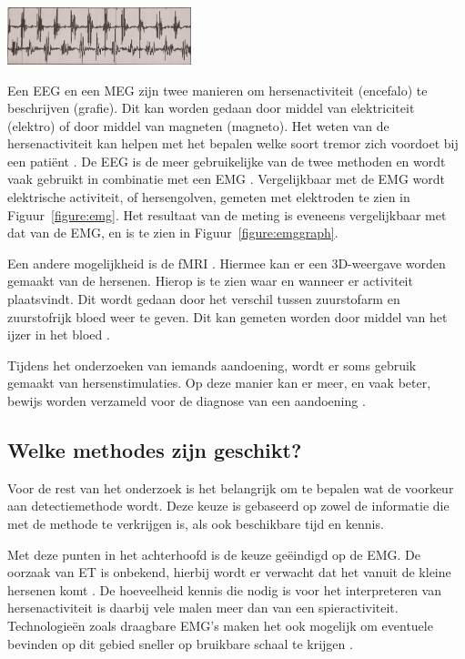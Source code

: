 \begin{center}
    \includegraphics[width=0.4\textwidth]{./graphics/graph-emg.png}
    \label{figure:emggraph}
\end{center}

Een EEG en een MEG zijn twee manieren om hersenactiviteit (encefalo) te beschrijven (grafie).
Dit kan worden gedaan door middel van elektriciteit (elektro) of door middel van magneten (magneto).
Het weten van de hersenactiviteit kan helpen met het bepalen welke soort tremor zich voordoet bij een patiënt \cite{elsevier2022,knf2022}.
De EEG is de meer gebruikelijke van de twee methoden en wordt vaak gebruikt in combinatie met een EMG \cite{knf2022}.
Vergelijkbaar met de EMG wordt elektrische activiteit, of hersengolven, gemeten met elektroden te zien in Figuur~\ref{figure:emg}.
Het resultaat van de meting is eveneens vergelijkbaar met dat van de EMG, en is te zien in Figuur~\ref{figure:emggraph}.

Een andere mogelijkheid is de fMRI \cite{elsevier2022}.
Hiermee kan er een 3D-weergave worden gemaakt van de hersenen.
Hierop is te zien waar en wanneer er activiteit plaatsvindt.
Dit wordt gedaan door het verschil tussen zuurstofarm en zuurstofrijk bloed weer te geven.
Dit kan gemeten worden door middel van het ijzer in het bloed \cite{hersenstichting2023}.

Tijdens het onderzoeken van iemands aandoening, wordt er soms gebruik gemaakt van hersenstimulaties.
Op deze manier kan er meer, en vaak beter, bewijs worden verzameld voor de diagnose van een aandoening \cite{elsevier2022}.

\subsection{Welke methodes zijn geschikt?}

Voor de rest van het onderzoek is het belangrijk om te bepalen wat de voorkeur aan detectiemethode wordt.
Deze keuze is gebaseerd op zowel de informatie die met de methode te verkrijgen is, als ook beschikbare tijd en kennis.

Met deze punten in het achterhoofd is de keuze geëindigd op de EMG.
De oorzaak van ET is onbekend, hierbij wordt er verwacht dat het vanuit de kleine hersenen komt \cite{elsevier2022}.
De hoeveelheid kennis die nodig is voor het interpreteren van hersenactiviteit is daarbij vele malen meer dan van een spieractiviteit.
Technologieën zoals draagbare EMG's maken het ook mogelijk om eventuele bevinden op dit gebied sneller op bruikbare schaal te krijgen \cite{frontiers2022}.
